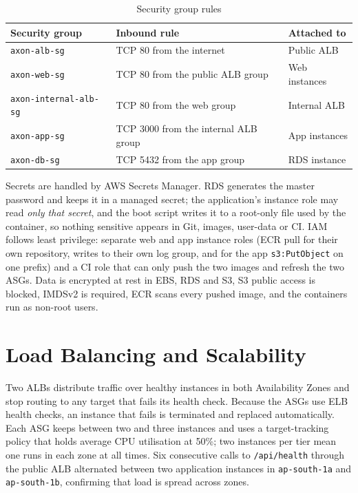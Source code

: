 \documentclass[10pt,a4paper]{article}
\newcommand{\hdr}{\rowcolor{rowblue}}
\begin{document}
\begin{table}[H]
\centering\small
\caption{Security group rules}\label{tab:sg}
\begin{tabular}{@{}p{3.5cm} p{6.1cm} p{4.0cm}@{}}
\toprule
\hdr Security group & Inbound rule & Attached to\\
\midrule
\texttt{axon-alb-sg} & TCP 80 from the internet & Public ALB\\
\texttt{axon-web-sg} & TCP 80 from the public ALB group & Web instances\\
\texttt{axon-internal-alb-sg} & TCP 80 from the web group & Internal ALB\\
\texttt{axon-app-sg} & TCP 3000 from the internal ALB group & App instances\\
\texttt{axon-db-sg} & TCP 5432 from the app group & RDS instance\\
\bottomrule
\end{tabular}
\end{table}

Secrets are handled by AWS Secrets Manager. RDS generates the master password and keeps it in a managed secret; the application's instance role
may read \emph{only that secret}, and the boot script writes it to a root-only file used by the container, so nothing sensitive appears in Git,
images, user-data or CI. IAM follows least privilege: separate web and app instance roles (ECR pull for their own repository, writes to their own
log group, and for the app \texttt{s3:PutObject} on one prefix) and a CI role that can only push the two images and refresh the two ASGs.
Data is encrypted at rest in EBS, RDS and S3, S3 public access is blocked, IMDSv2 is required, ECR scans every pushed image, and the containers run as
non-root users.

\section{Load Balancing and Scalability}
Two ALBs distribute traffic over healthy instances in both Availability Zones and stop routing to any target that fails its health check.
Because the ASGs use ELB health checks, an instance that fails is terminated and replaced automatically. Each ASG keeps between two and three instances
and uses a target-tracking policy that holds average CPU utilisation at 50\%; two instances per tier mean one runs in each zone at all times. Six
consecutive calls to \texttt{/api/health} through the public ALB alternated between two application instances in \texttt{ap-south-1a} and
\texttt{ap-south-1b}, confirming that load is spread across zones.
\end{document}

